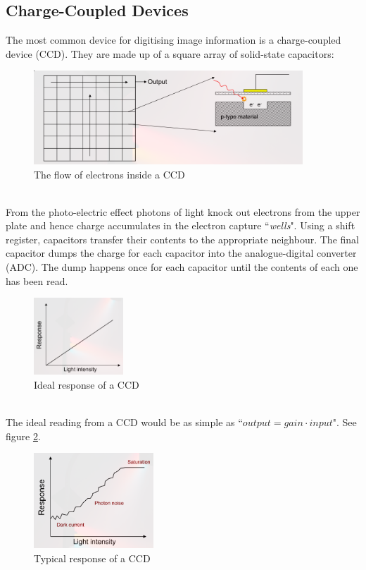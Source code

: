 \documentclass{article}
\begin{document}
\subsection{Charge-Coupled Devices}
The most common device for digitising image information is a charge-coupled device (CCD). 
They are made up of a square array of solid-state capacitors: \\
\begin{figure}[htbp]
	\centering
	\includegraphics[width=0.9\textwidth]{ccd.png}
	\caption{The flow of electrons inside a CCD}
	\label{fig:CCD}
\end{figure} \\
From the photo-electric effect photons of light knock out electrons from the upper plate and hence charge accumulates in the electron capture ``{\it wells}".
Using a shift register, capacitors transfer their contents to the appropriate neighbour.
The final capacitor dumps the charge for each capacitor into the analogue-digital converter (ADC).
The dump happens once for each capacitor until the contents of each one has been read. \\
\begin{figure}
	\centering
	\includegraphics[width=0.3\textwidth]{ccdResponse1.png}
	\caption{Ideal response of a CCD}
	\label{fig:ccdResponse1}
\end{figure}
\\
The ideal reading from a CCD would be as simple as ``$output = gain\cdot input$". See figure \ref{fig:ccdResponse1}.
\begin{figure}
	\centering
	\includegraphics[width=0.4\textwidth]{ccdResponse2.png}
	\caption{Typical response of a CCD}
	\label{fig:ccdResponse2}
\end{figure}
\end{document}
